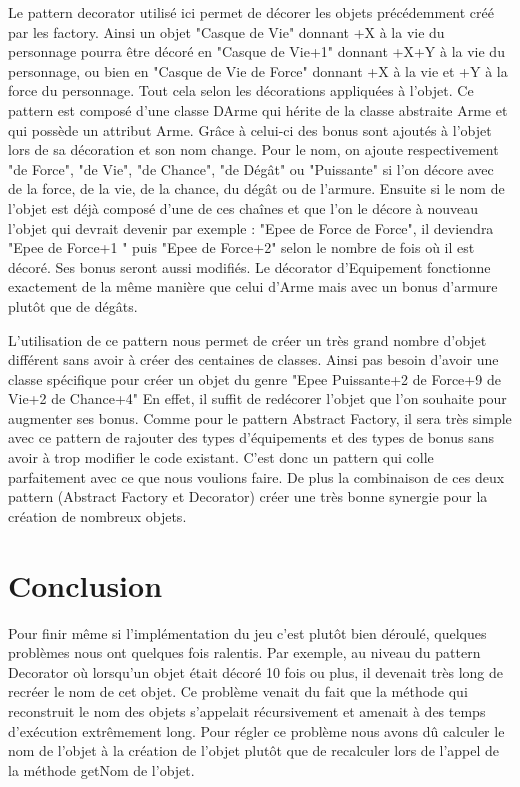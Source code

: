 \documentclass[a4paper]{article}
\begin{document}
Le pattern decorator utilisé ici permet de décorer les objets précédemment créé par les factory.
Ainsi un objet "Casque de Vie" donnant +X à la vie du personnage pourra être décoré en "Casque de Vie+1" donnant +X+Y à la vie du personnage, ou bien en "Casque de Vie de Force" donnant +X à la vie et +Y à la force du personnage.
Tout cela selon les décorations appliquées à l'objet.
Ce pattern est composé d'une classe DArme qui hérite de la classe abstraite Arme et qui possède un attribut Arme.
Grâce à celui-ci des bonus sont ajoutés à l'objet lors de sa décoration et son nom change.
Pour le nom, on ajoute respectivement "de Force", "de Vie", "de Chance", "de Dégât" ou "Puissante" si l'on décore avec de la force, de la vie, de la chance, du dégât ou de l'armure.
Ensuite si le nom de l'objet est déjà composé d'une de ces chaînes et que l'on le décore à nouveau l'objet qui devrait devenir par exemple :
"Epee de Force de Force", il deviendra "Epee de Force+1 " puis "Epee de Force+2" selon le nombre de fois où il est décoré.
Ses bonus seront aussi modifiés.
Le décorator d'Equipement fonctionne exactement de la même manière que celui d'Arme mais avec un bonus d'armure plutôt que de dégâts.

L'utilisation de ce pattern nous permet de créer un très grand nombre d'objet différent sans avoir à créer des centaines de classes. Ainsi pas besoin d'avoir une classe spécifique pour créer un objet du genre "Epee Puissante+2 de Force+9 de Vie+2 de Chance+4"
En effet, il suffit de redécorer l'objet que l'on souhaite pour augmenter ses bonus.
Comme pour le pattern Abstract Factory, il sera très simple avec ce pattern de rajouter des types d'équipements et des types de bonus sans avoir à trop modifier le code existant. C'est donc un pattern qui colle parfaitement avec ce que nous voulions faire.
De plus la combinaison de ces deux pattern (Abstract Factory et Decorator) créer une très bonne synergie pour la création de nombreux objets.

  \newpage
  \section{Conclusion}
Pour finir même si l'implémentation du jeu c'est plutôt bien déroulé, quelques problèmes nous ont quelques fois ralentis.
Par exemple, au niveau du pattern Decorator où lorsqu'un objet était décoré 10 fois ou plus, il devenait très long de recréer le nom de cet objet.
Ce problème venait du fait que la méthode qui reconstruit le nom des objets s'appelait récursivement et amenait à des temps d'exécution extrêmement long.
Pour régler ce problème nous avons dû calculer le nom de l'objet à la création de l'objet plutôt que de recalculer lors de l'appel de la méthode getNom de l'objet.
\end{document}
